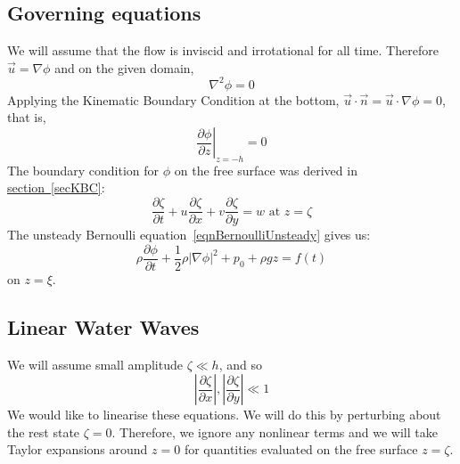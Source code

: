 \documentclass[../Main.tex]{subfiles}
\begin{document}
\subsection{Governing equations}
We will assume that the flow is inviscid and irrotational for all time. Therefore $\vec{u} = \nabla\phi$ and on the given domain,
\begin{equation}
    \nabla^2 \phi = 0
    \label{eqnLaplace}
\end{equation}
Applying the Kinematic Boundary Condition at the bottom, $\vec{u} \cdot \vec{n} = \vec{u} \cdot \nabla \phi = 0$, that is,
\begin{equation}
    \left.\frac{\partial \phi}{\partial z}\right|_{z = -h} = 0
    \label{eqnBottomKBC}
\end{equation}
The boundary condition for $\phi$ on the free surface was derived in \hyperref[secKBC]{section~\ref{secKBC}}:
\begin{equation}
    \frac{\partial \zeta}{\partial t} + u \frac{\partial \zeta}{\partial x} + v \frac{\partial \zeta}{\partial y} = w \text{ at } z = \zeta
    \label{eqnFreeSurfaceKBC}
\end{equation}
The unsteady Bernoulli equation~\ref{eqnBernoulliUnsteady} gives us:
\begin{equation}
    \rho \frac{\partial \phi}{\partial t} + \frac12 \rho |\nabla \phi|^2 + p_0 + \rho g z = f(t)
    \label{eqnFreeSurfaceDBC}
\end{equation}
on $z = \xi$.
\subsection{Linear Water Waves}
We will assume small amplitude $\zeta \ll h$, and so
\begin{equation*}
    \left|\frac{\partial \zeta}{\partial x}\right|, \left|\frac{\partial \zeta}{\partial y}\right| \ll 1
\end{equation*}
We would like to linearise these equations. We will do this by perturbing about the rest state $\zeta = 0$. Therefore, we ignore any nonlinear terms and we will take Taylor expansions around $z = 0$ for quantities evaluated on the free surface $z = \zeta$.
\end{document}
